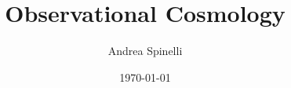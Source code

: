 \documentclass[a4paper,12pt]{report}
\institute{UniTs - University of Trieste}
\title{Observational Cosmology}
\author{Andrea Spinelli}
\date{\today}
\begin{document}
\maketitle



\toc


\printbibliography
\end{document}
